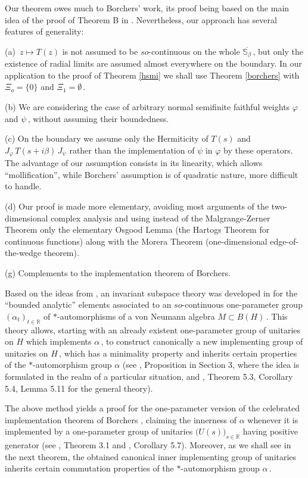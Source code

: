 \documentclass[reqno]{amsart}
\theoremstyle{definition}
\theoremstyle{remark}
\numberwithin{equation}{section}
\theoremstyle{plain}
\begin{document}
 Our theorem owes much to Borchers' work,
its proof being based on the main idea of the proof of Theorem B in
\cite{Bo3}. Nevertheless, our approach has several features of
generality:

(a) $\, z\longmapsto T(z)$ is not assumed to be $so$-continuous on the
whole $\overline{\mathbb S_\beta}\,$, but only the existence of radial
limits are assumed almost everywhere on the boundary. In our
application to the proof of Theorem \ref{hsmi} we shall use
Theorem \ref{borchers} with $\Xi_o=\{ 0\}$ and $\Xi_1=\emptyset\,$.

(b) We are considering the case of arbitrary normal semifinite 
faithful weights $\varphi$ and $\psi\,$, without assuming their
boundedness.

(c) On the boundary we assume only the Hermiticity of $T(s)$ and
$J_\varphi\, T(s+i\beta )\, J_\psi$ rather than the implementation
of $\psi$ in $\varphi$ by these operators. The advantage of our
assumption consists in its linearity, which allows ``mollification'',
while Borchers' assumption is of quadratic nature, more difficult
to handle.

(d) Our proof is made more elementary, avoiding most arguments of
the two-dimensional complex analysis and using instead of the
Malgrange-Zerner Theorem only the elementary Osgood Lemma (the
Hartogs Theorem for continuous functions) along with the Morera
Theorem (one-dimensional edge-of-the-wedge theorem).

\bigskip
\noindent (g) {\sc Complements to the implementation theorem
of Borchers}.
\bigskip

Based on the ideas from \cite{Arv}, an invariant subspace theory
was developed in \cite{Z2} for the ``bounded analytic'' elements
associated to an $so$-continuous one-parameter group
$(\alpha_t )_{t\in\mathbb R}$
of $*$-automorphisms of a von Neumann algebra $M\subset B(H)\,$.
This theory allows, starting with an already existent one-parameter
group of unitaries on $H$ which implements $\alpha\,$, to construct
canonically a new implementing group of unitaries on $H\,$, which
has a minimality property and inherits certain properties of the
$*$-automorphism group $\alpha$ (see \cite{Arv}, Proposition in
Section 3, where the idea is formulated in the realm of a particular
situation, and \cite{Z2}, Theorem 5.3, Corollary 5.4, Lemma 5.11
for the general theory).

The above method yields a proof for
the one-parameter version of the celebrated implementation theorem
of Borchers \cite{Bo1}, claiming the innerness of $\alpha$ whenever
it is implemented by a one-parameter group of unitaries $\big(
U(s)\big)_{s\in\mathbb R}$
having positive generator (see \cite{Arv}, Theorem 3.1 and \cite{Z2},
Corollary 5.7). Moreover, as we shall see in the next theorem, the
obtained canonical inner implementing group of unitaries inherits
certain commutation properties of the $*$-automorphism group
$\alpha\,$.
\end{document}
